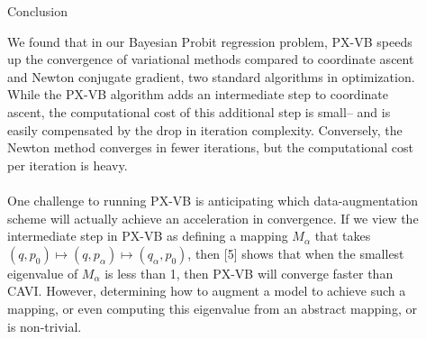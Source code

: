 \documentclass[final]{beamer}
\newlength{\sepwid}
\newlength{\onecolwid}
\newlength{\twocolwid}
\begin{document}
\begin{frame}[t]
\begin{columns}[t]
\begin{column}{\twocolwid}
%
%
%
%
%

\end{column} %

\begin{column}{\sepwid}\end{column} %

\begin{column}{\onecolwid} %


\begin{block}{Conclusion}

We found that in our Bayesian Probit regression problem, PX-VB speeds up the convergence of variational methods compared to coordinate ascent and Newton conjugate gradient, two standard algorithms in optimization. While the PX-VB algorithm adds an intermediate step to coordinate ascent, the computational cost of this additional step is small-- and is easily compensated by the drop in iteration complexity. Conversely, the Newton method converges in fewer iterations, but the computational cost per iteration is heavy. \\~\\

One challenge to running PX-VB is anticipating which data-augmentation scheme will actually achieve an acceleration in convergence. If we view the intermediate step in PX-VB as defining a mapping $M_\alpha$ that takes $(q, p_0) \mapsto (q, p_\alpha) \mapsto (q_\alpha, p_0)$, then [5] shows that when the smallest eigenvalue of $M_\alpha$ is less than 1, then PX-VB will converge faster than CAVI. However, determining how to augment a model to achieve such a mapping, or even computing this eigenvalue from an abstract mapping, or is non-trivial.


\end{block}
\end{column}
\end{columns}
\end{frame}
\end{document}
